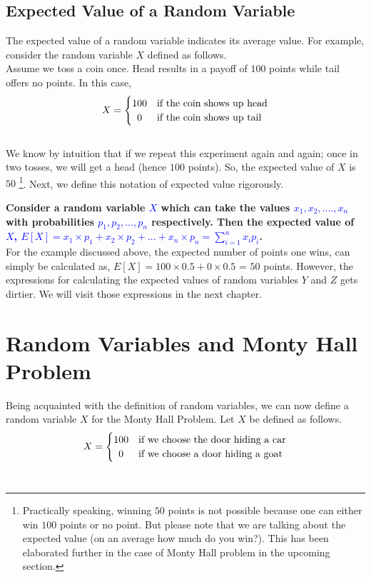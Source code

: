 \documentclass{book}
\begin{document}
\subsection{Expected Value of a Random Variable}
The expected value of a random variable indicates its average value. For example, consider the random variable $X$ defined as follows. \\
Assume we toss a coin once. Head results in a payoff of $100$ points while tail offers no points. In this case, \\
\[
X = \left\{\def\arraystretch{1.2}%
\begin{array}{@{}c@{\quad}l@{}}
100 & \text{if the coin shows up head}\\
0 & \text{if the coin shows up tail}\\
\end{array}\right.
\]\\

We know by intuition that if we repeat this experiment again and again; once in two tosses, we will get a head (hence $100$ points). So, the expected value of $X$ is $50$ \footnote{Practically speaking, winning $50$ points is not possible because one can either win $100$ points or no point. But please note that we are talking about the expected value (on an average how much do you win?). This has been elaborated further in the case of Monty Hall problem in the upcoming section. }. Next, we define this notation of expected value rigorously. 

\textbf{Consider a random variable {\textcolor{blue}{$X$}} which can take the values {\textcolor{blue}{$x_1, x_2, ...., x_n$}} with probabilities {\textcolor{blue}{$p_1,p_2,...,p_n$}} respectively. Then the expected value of {\textcolor{blue}{$X$, $E[X]=x_1 \times p_1 + x_2 \times p_2 + ... + x_n \times p_n = \sum_{i=1}^{n} x_i p_i$}}.}\\

For the example discussed above, the expected number of points one wins, can simply be calculated as, $E[X] = 100 \times 0.5 + 0 \times 0.5$ = $50$ points. However, the expressions for calculating the expected values of random variables $Y$ and $Z$ gets dirtier. We will visit those expressions in the next chapter.   


\section{Random Variables and Monty Hall Problem}
Being acquainted with the definition of random variables, we can now define a random variable $X$ for the Monty Hall Problem. Let $X$ be defined as follows.\\
\[
X = \left\{\def\arraystretch{1.2}%
\begin{array}{@{}c@{\quad}l@{}}
100 & \text{if we choose the door hiding a car}\\
0 & \text{if we choose a door hiding a goat}\\
\end{array}\right.
\]\\
\end{document}

